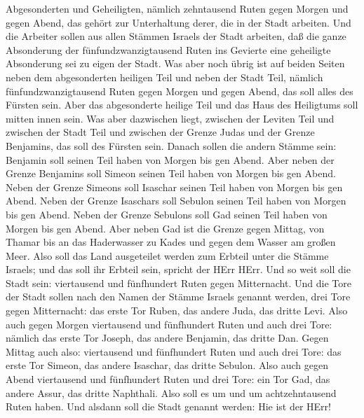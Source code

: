Abgesonderten und Geheiligten, nämlich zehntausend Ruten gegen Morgen
und gegen Abend, das gehört zur Unterhaltung derer, die in der Stadt
arbeiten.  Und die Arbeiter sollen aus allen Stämmen
Israels der Stadt arbeiten,  daß die ganze Absonderung der
fünfundzwanzigtausend Ruten ins Gevierte eine geheiligte Absonderung sei
zu eigen der Stadt.  Was aber noch übrig ist auf beiden
Seiten neben dem abgesonderten heiligen Teil und neben der Stadt Teil,
nämlich fünfundzwanzigtausend Ruten gegen Morgen und gegen Abend, das
soll alles des Fürsten sein. Aber das abgesonderte heilige Teil und das
Haus des Heiligtums soll mitten innen sein.  Was aber
dazwischen liegt, zwischen der Leviten Teil und zwischen der Stadt Teil
und zwischen der Grenze Judas und der Grenze Benjamins, das soll des
Fürsten sein.  Danach sollen die andern Stämme sein:
Benjamin soll seinen Teil haben von Morgen bis gen Abend. 
Aber neben der Grenze Benjamins soll Simeon seinen Teil haben von Morgen
bis gen Abend.  Neben der Grenze Simeons soll Isaschar
seinen Teil haben von Morgen bis gen Abend.  Neben der
Grenze Isaschars soll Sebulon seinen Teil haben von Morgen bis gen
Abend.  Neben der Grenze Sebulons soll Gad seinen Teil
haben von Morgen bis gen Abend.  Aber neben Gad ist die
Grenze gegen Mittag, von Thamar bis an das Haderwasser zu Kades und
gegen dem Wasser am großen Meer.  Also soll das Land
ausgeteilet werden zum Erbteil unter die Stämme Israels; und das soll
ihr Erbteil sein, spricht der HErr HErr.  Und so weit soll
die Stadt sein: viertausend und fünfhundert Ruten gegen Mitternacht.
 Und die Tore der Stadt sollen nach den Namen der Stämme
Israels genannt werden, drei Tore gegen Mitternacht: das erste Tor
Ruben, das andere Juda, das dritte Levi.  Also auch gegen
Morgen viertausend und fünfhundert Ruten und auch drei Tore: nämlich das
erste Tor Joseph, das andere Benjamin, das dritte Dan. 
Gegen Mittag auch also: viertausend und fünfhundert Ruten und auch drei
Tore: das erste Tor Simeon, das andere Isaschar, das dritte Sebulon.
 Also auch gegen Abend viertausend und fünfhundert Ruten
und drei Tore: ein Tor Gad, das andere Assur, das dritte Naphthali.
 Also soll es um und um achtzehntausend Ruten haben. Und
alsdann soll die Stadt genannt werden: Hie ist der HErr!
